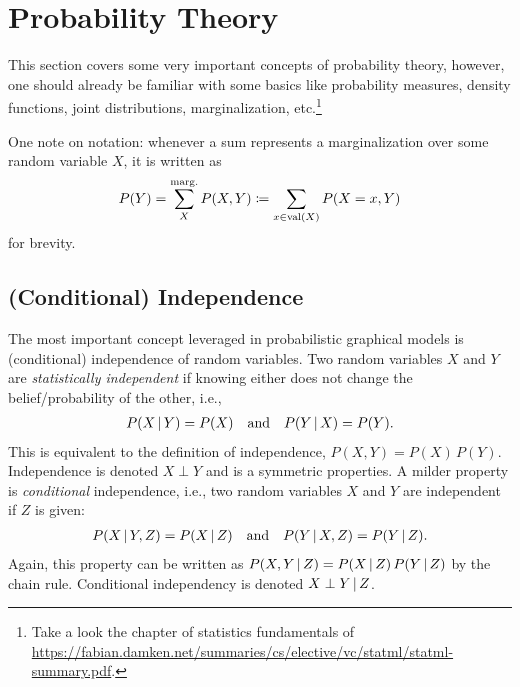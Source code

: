 	\section{Probability Theory}
		This section covers some very important concepts of probability theory, however, one should already be familiar with some basics like probability measures, density functions, joint distributions, marginalization, etc.\footnote{Take a look the chapter of statistics fundamentals of \url{https://fabian.damken.net/summaries/cs/elective/vc/statml/statml-summary.pdf}.}

		One note on notation: whenever a sum represents a marginalization over some random variable \(X\), it is written as
		\begin{equation}
			P(Y) = \sum_{X}^{\operatorname{marg.}} P(X, Y) \coloneqq \sum_{x \in \operatorname{val}(X)} P(X = x, Y)
		\end{equation}
		for brevity.

		\subsection{(Conditional) Independence}
			\label{subsec:condIndependence}

			The most important concept leveraged in probabilistic graphical models is (conditional) independence of random variables. Two random variables \(X\) and \(Y\) are \emph{statistically independent} if knowing either does not change the belief/probability of the other, i.e.,
			\begin{gather}
				P(X \,\vert\, Y) = P(X)
				\quad\text{and}\quad
				P(Y \,\vert\, X) = P(Y).
			\end{gather}
			This is equivalent to the definition of independence, \( P(X, Y) = P(X) \, P(Y) \). Independence is denoted \( X \perp Y \) and is a symmetric properties. A milder property is \emph{conditional} independence, i.e., two random variables \(X\) and \(Y\) are independent if \(Z\) is given:
			\begin{gather}
				P(X \,\vert\, Y, Z) = P(X \,\vert\, Z)
				\quad\text{and}\quad
				P(Y \,\vert\, X, Z) = P(Y \,\vert\, Z).
			\end{gather}
			Again, this property can be written as \( P(X, Y \,\vert\, Z) = P(X \,\vert\, Z) \, P(Y \,\vert\, Z) \) by the chain rule. Conditional independency is denoted \( X \perp Y \,\vert\, Z \).

